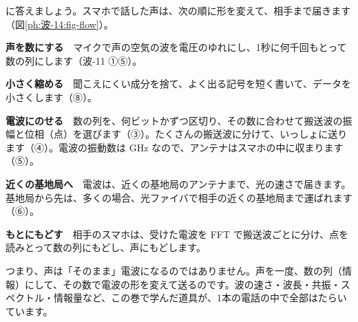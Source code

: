 \leavevmode\label{ph:波-14:sec9}\bkhatenaref に答えましょう。スマホで話した声は、次の順に形を変えて、相手まで届きます（図\ref{ph:波-14:fig-flow}）。
\begin{bkfigure}
\label{ph:波-14:fig-flow}
\end{bkfigure}
\begin{enumerate}[label={\bkcircled[bkBlue]{\arabic*}}, leftmargin=2.4\zw, itemsep=2pt, topsep=2pt]
\item \textbf{声を数にする}　マイクで声の空気の波を電圧のゆれにし、1秒に何千回もとって数の列にします（波-11 ①⑤）。
\item \textbf{小さく縮める}　聞こえにくい成分を捨て、よく出る記号を短く書いて、データを小さくします（⑧）。
\item \textbf{電波にのせる}　数の列を、何ビットかずつ区切り、その数に合わせて搬送波の振幅と位相（点）を選びます（③）。たくさんの搬送波に分けて、いっしょに送ります（④）。電波の振動数は GHz なので、アンテナはスマホの中に収まります（⑤）。
\item \textbf{近くの基地局へ}　電波は、近くの基地局のアンテナまで、光の速さで届きます。基地局から先は、多くの場合、光ファイバで相手の近くの基地局まで運ばれます（⑥）。
\item \textbf{もとにもどす}　相手のスマホは、受けた電波を FFT で搬送波ごとに分け、点を読みとって数の列にもどし、声にもどします。
\end{enumerate}
\noindent つまり、声は「そのまま」電波になるのではありません。声を一度、数の列（情報）にして、その数で電波の形を変えて送るのです。波の速さ・波長・共振・スペクトル・情報量など、この巻で学んだ道具が、1本の電話の中で全部はたらいています。

